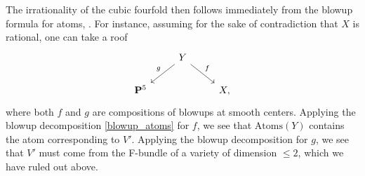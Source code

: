 \documentclass[11pt, reqno]{amsart}
\numberwithin{equation}{section}
\theoremstyle{plain}
\theoremstyle{definition}
\theoremstyle{italicsname}
\newcommand{\Atoms}{\mathrm{Atoms}}
\newcommand{\bP}{\mathbf{P}}
\begin{document}
The irrationality of the cubic fourfold then follows immediately from the blowup formula for atoms, . For instance, assuming for the sake of contradiction that $X$ is rational, one can take a roof
\[
    \begin{tikzcd}
        & Y \ar[dr, "f"] \ar[dl, "g"'] \\
        \bP^5 & & X,
    \end{tikzcd}
\]
where both $f$ and $g$ are compositions of blowups at smooth centers. Applying the blowup decomposition \eqref{blowup_atoms} for $f$, we see that $\Atoms(Y)$ contains the atom corresponding to $V'$. Applying the blowup decomposition for $g$, we see that $V'$ must come from the F-bundle of a variety of dimension $\leq 2$, which we have ruled out above.
























\newpage
{}



\end{document}
